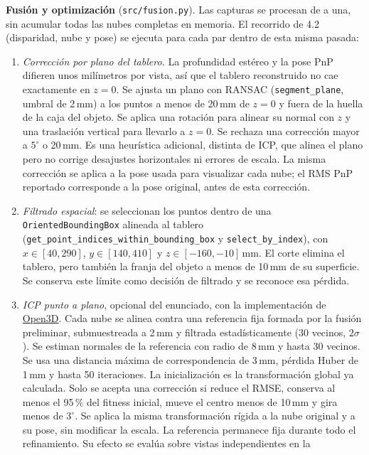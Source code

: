 \documentclass[10pt,a4paper]{article}
\begin{document}
\textbf{Fusión y optimización} (\texttt{src/fusion.py}). Las capturas se procesan de a una, sin
acumular todas las nubes completas en memoria. El recorrido de 4.2 (disparidad, nube y pose)
se ejecuta para cada par dentro de esta misma pasada:
\begin{enumerate}\setlength{\itemsep}{0pt}
\item \emph{Corrección por plano del tablero.} La profundidad estéreo y la pose PnP difieren
unos milímetros por vista, así que el tablero reconstruido no cae exactamente en $z=0$.
Se ajusta un plano con RANSAC (\texttt{segment\_plane}, umbral de 2\,mm) a los puntos a menos
de 20\,mm de $z=0$ y fuera de la huella de la caja del objeto. Se aplica una rotación para
alinear su normal con $z$ y una traslación vertical para llevarlo a $z=0$.
Se rechaza una corrección mayor a $5^\circ$ o 20\,mm. Es una heurística adicional, distinta
de ICP, que alinea el plano pero no corrige desajustes horizontales ni errores de escala.
La misma corrección se aplica a la pose usada para visualizar cada nube; el RMS PnP
reportado corresponde a la pose original, antes de esta corrección.
\item \emph{Filtrado espacial}: se seleccionan los puntos dentro de una
\texttt{OrientedBoundingBox} alineada al tablero (\texttt{get\_point\_indices\_}\allowbreak\texttt{within\_bounding\_box}
y \texttt{select\_by\_index}), con $x\in[40,290]$, $y\in[140,410]$ y $z\in[-160,-10]$\,mm.
El corte elimina el tablero, pero también la franja del objeto a menos de 10\,mm de su
superficie. Se conserva este límite como decisión de filtrado y se reconoce esa pérdida.
\item \emph{ICP punto a plano}, opcional del enunciado, con la implementación de
\href{https://www.open3d.org/docs/release/tutorial/pipelines/icp_registration.html}{Open3D}.
Cada nube se alinea contra una referencia fija formada por la fusión preliminar,
submuestreada a 2\,mm y filtrada estadísticamente (30 vecinos, $2\sigma$). Se estiman
normales de la referencia con radio de 8\,mm y hasta 30 vecinos. Se usa una distancia
máxima de correspondencia de 3\,mm, pérdida Huber de 1\,mm y hasta 50 iteraciones.
La inicialización es la transformación global ya calculada. Solo se acepta una corrección
si reduce el RMSE, conserva al menos el 95\,\% del fitness inicial, mueve el centro menos
de 10\,mm y gira menos de $3^\circ$. Se aplica la misma transformación rígida a la nube
original y a su pose, sin modificar la escala. La referencia permanece fija durante
todo el refinamiento. Su efecto se evalúa sobre vistas independientes en la

\end{enumerate}
\end{document}

